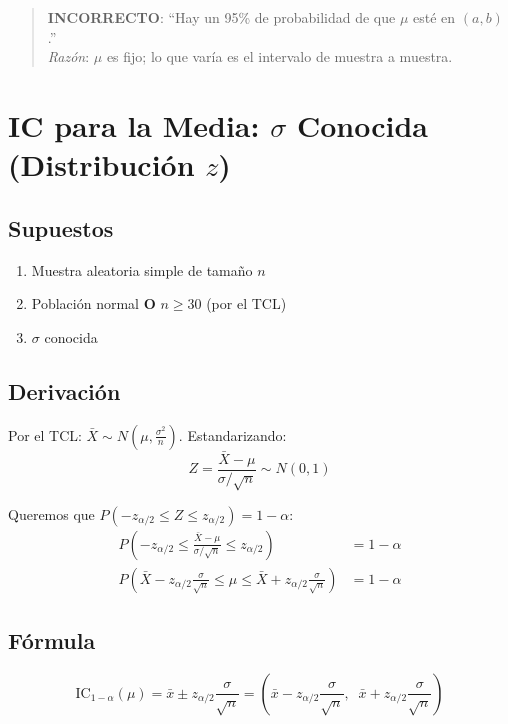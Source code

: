 \documentclass[11pt, a4paper]{article}
\begin{document}
\begin{quote}
\textbf{INCORRECTO}: ``Hay un 95\% de probabilidad de que $\mu$ est\'e en $(a, b)$.'' \\
\textit{Raz\'on}: $\mu$ es fijo; lo que var\'ia es el intervalo de muestra a muestra.
\end{quote}

\section{IC para la Media: $\sigma$ Conocida (Distribuci\'on $z$)}

\subsection{Supuestos}
\begin{enumerate}
  \item Muestra aleatoria simple de tama\~no $n$
  \item Poblaci\'on normal \textbf{O} $n \geq 30$ (por el TCL)
  \item $\sigma$ conocida
\end{enumerate}

\subsection{Derivaci\'on}

Por el TCL: $\bar{X} \sim N\!\left(\mu, \frac{\sigma^2}{n}\right)$. Estandarizando:
\[
Z = \frac{\bar{X} - \mu}{\sigma/\sqrt{n}} \sim N(0,1)
\]

Queremos que $P(-z_{\alpha/2} \leq Z \leq z_{\alpha/2}) = 1-\alpha$:
\begin{align*}
P\!\left(-z_{\alpha/2} \leq \frac{\bar{X} - \mu}{\sigma/\sqrt{n}} \leq z_{\alpha/2}\right) &= 1-\alpha \\[4pt]
P\!\left(\bar{X} - z_{\alpha/2}\frac{\sigma}{\sqrt{n}} \leq \mu \leq \bar{X} + z_{\alpha/2}\frac{\sigma}{\sqrt{n}}\right) &= 1-\alpha
\end{align*}

\subsection{F\'ormula}

\[
\boxed{\text{IC}_{1-\alpha}(\mu) = \bar{x} \pm z_{\alpha/2} \frac{\sigma}{\sqrt{n}}
= \left(\bar{x} - z_{\alpha/2}\frac{\sigma}{\sqrt{n}},\;\; \bar{x} + z_{\alpha/2}\frac{\sigma}{\sqrt{n}}\right)}
\]
\end{document}
